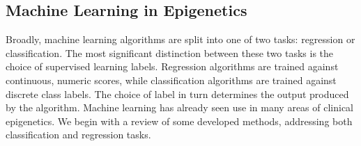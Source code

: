 \documentclass{article}
\begin{document}

\subsection{Machine Learning in Epigenetics}
Broadly, machine learning algorithms are split into one of two tasks: regression or classification. The most significant distinction between these two tasks is the choice of supervised learning labels. Regression algorithms are trained against continuous, numeric scores, while classification algorithms are trained against discrete class labels. The choice of label in turn determines the output produced by the algorithm.
Machine learning has already seen use in many areas of clinical epigenetics. We begin with a review of some developed methods, addressing both classification and regression tasks.
\end{document}
